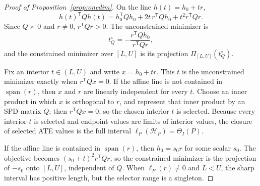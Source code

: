 \documentclass[11pt]{article}
\newcommand{\transpose}{\mathsf{T}}
\newcommand{\calH}{\mathcal{H}}
\theoremstyle{definition}
\theoremstyle{plain}
\theoremstyle{remark}
\begin{document}
\begin{proof}[Proof of Proposition~\ref{prop:onedim}]
On the line \(h(t)=h_0+tr\),
\[
  h(t)^\transpose Qh(t)
  =
  h_0^\transpose Qh_0+2t\,r^\transpose Qh_0+t^2 r^\transpose Qr .
\]
Since \(Q\succ0\) and \(r\neq0\), \(r^\transpose Qr>0\).  The unconstrained
minimizer is
\[
  t^\circ_Q=-\frac{r^\transpose Qh_0}{r^\transpose Qr},
\]
and the constrained minimizer over \([L,U]\) is its projection
\(\Pi_{[L,U]}(t^\circ_Q)\).

Fix an interior \(t\in(L,U)\) and write \(x=h_0+tr\).  This \(t\) is the
unconstrained minimizer exactly when \(r^\transpose Qx=0\).  If the affine
line is not contained in \(\operatorname{span}(r)\), then \(x\) and \(r\) are
linearly independent for every \(t\).  Choose an inner product in which
\(x\) is orthogonal to \(r\), and represent that inner product by an SPD
matrix \(Q\); then \(r^\transpose Qx=0\), so the chosen interior \(t\) is
selected.  Because every interior \(t\) is selected and endpoint values are
limits of interior values, the closure of selected ATE values is the full
interval \(\ell_P(\calH_P)=\Theta_I(P)\).

If the affine line is contained in \(\operatorname{span}(r)\), then
\(h_0=s_0r\) for some scalar \(s_0\).  The objective becomes
\((s_0+t)^2 r^\transpose Qr\), so the constrained minimizer is the projection
of \(-s_0\) onto \([L,U]\), independent of \(Q\).  When
\(\ell_P(r)\neq0\) and \(L<U\), the sharp interval has positive length, but
the selector range is a singleton.
\end{proof}
\end{document}
